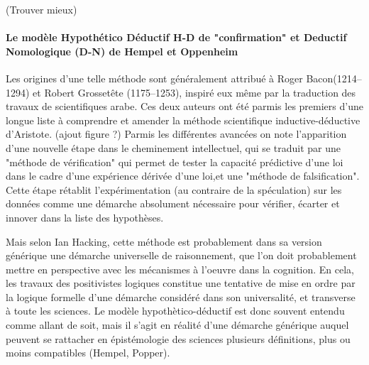 {%
(Trouver mieux)

\paragraph{Le modèle Hypothético Déductif H-D de "confirmation" et Deductif Nomologique (D-N) de Hempel et Oppenheim}

Les origines d'une telle méthode sont généralement attribué à Roger Bacon(1214–1294) et Robert Grossetête (1175–1253), inspiré eux même par la traduction des travaux de scientifiques arabe. Ces deux auteurs ont été parmis les premiers d'une longue liste à comprendre et amender la méthode scientifique inductive-déductive d'Aristote. (ajout figure ?) Parmis les différentes avancées on note l'apparition d'une nouvelle étape dans le cheminement intellectuel, qui se traduit par une "méthode de vérification" qui permet de tester la capacité prédictive d'une loi dans le cadre d'une expérience dérivée d'une loi,et une "méthode de falsification". Cette étape rétablit l'expérimentation (au contraire de la spéculation) sur les données comme une démarche absolument nécessaire pour vérifier, écarter et innover dans la liste des hypothèses. \autocite[31]{Losee1972} \autocite[162]{Gaugh2003} \autocite[242]{Gaugh2003}

Mais selon Ian Hacking, cette méthode est probablement dans sa version générique une démarche universelle de raisonnement, que l'on doit probablement mettre en perspective avec les mécanismes à l'oeuvre dans la cognition. En cela, les travaux des positivistes logiques constitue une tentative de mise en ordre par la logique formelle d'une démarche considéré dans son universalité, et transverse à toute les sciences. Le modèle hypothètico-déductif est donc souvent entendu comme allant de soit, mais il s'agit en réalité d'une démarche générique auquel peuvent se rattacher en épistémologie des sciences plusieurs définitions, plus ou moins compatibles (Hempel, Popper).

}
